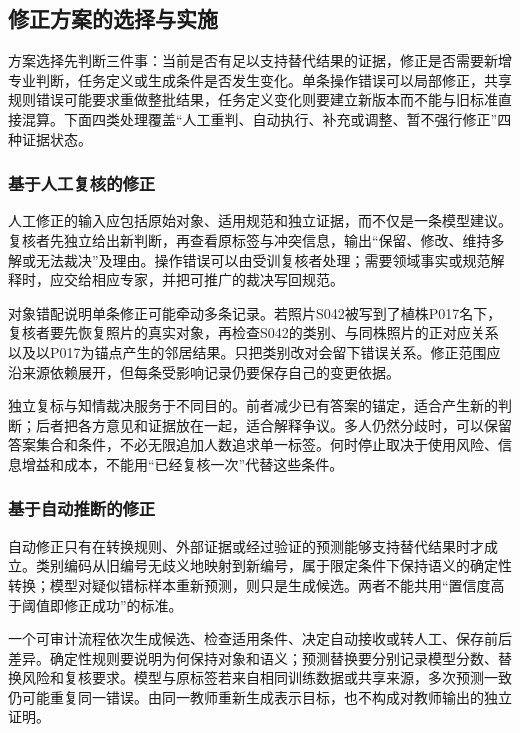 \subsection{修正方案的选择与实施}
\label{sec:knowledge-quality-assessment-correction-repair-selection}

方案选择先判断三件事：当前是否有足以支持替代结果的证据，修正是否需要新增专业判断，任务定义或生成条件是否发生变化。单条操作错误可以局部修正，共享规则错误可能要求重做整批结果，任务定义变化则要建立新版本而不能与旧标准直接混算。下面四类处理覆盖“人工重判、自动执行、补充或调整、暂不强行修正”四种证据状态。

\subsubsection{基于人工复核的修正}
\label{sec:knowledge-quality-assessment-correction-human-repair}

人工修正的输入应包括原始对象、适用规范和独立证据，而不仅是一条模型建议。复核者先独立给出新判断，再查看原标签与冲突信息，输出“保留、修改、维持多解或无法裁决”及理由。操作错误可以由受训复核者处理；需要领域事实或规范解释时，应交给相应专家，并把可推广的裁决写回规范。

对象错配说明单条修正可能牵动多条记录。若照片S042被写到了植株P017名下，复核者要先恢复照片的真实对象，再检查S042的类别、与同株照片的正对应关系以及以P017为锚点产生的邻居结果。只把类别改对会留下错误关系。修正范围应沿来源依赖展开，但每条受影响记录仍要保存自己的变更依据。

独立复标与知情裁决服务于不同目的。前者减少已有答案的锚定，适合产生新的判断；后者把各方意见和证据放在一起，适合解释争议。多人仍然分歧时，可以保留答案集合和条件，不必无限追加人数追求单一标签。何时停止取决于使用风险、信息增益和成本，不能用“已经复核一次”代替这些条件。

\subsubsection{基于自动推断的修正}
\label{sec:knowledge-quality-assessment-correction-automatic-repair}

自动修正只有在转换规则、外部证据或经过验证的预测能够支持替代结果时才成立。类别编码从旧编号无歧义地映射到新编号，属于限定条件下保持语义的确定性转换；模型对疑似错标样本重新预测，则只是生成候选。两者不能共用“置信度高于阈值即修正成功”的标准。

一个可审计流程依次生成候选、检查适用条件、决定自动接收或转人工、保存前后差异。确定性规则要说明为何保持对象和语义；预测替换要分别记录模型分数、替换风险和复核要求。模型与原标签若来自相同训练数据或共享来源，多次预测一致仍可能重复同一错误。由同一教师重新生成表示目标，也不构成对教师输出的独立证明。

